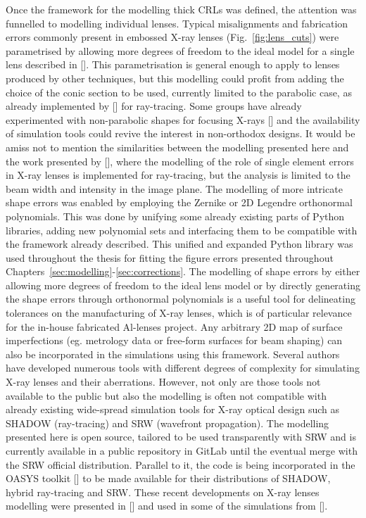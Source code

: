 \begin{refsection}
Once the framework for the modelling thick CRLs was defined, the attention was funnelled to modelling individual lenses. Typical misalignments and fabrication errors commonly present in embossed X-ray lenses (Fig.~\ref{fig:lens_cuts}) were parametrised by allowing more degrees of freedom to the ideal model for a single lens described in [\cite{Baltser2011}]. This parametrisation is general enough to apply to lenses produced by other techniques, but this modelling could profit from adding the choice of the conic section to be used, currently limited to the parabolic case, as already implemented by [\cite{SanchezdelRio2012,Andrejczuk2010}] for ray-tracing. Some groups have already experimented with non-parabolic shapes for focusing X-rays [\cite{Alianelli2007,Evans-Lutterodt2003, Alianelli2015, Sutter2017}] and the availability of simulation tools could revive the interest in non-orthodox designs. It would be amiss not to mention the similarities between the modelling presented here and the work presented by [\cite{Andrejczuk2010}], where the modelling of the role of single element errors in X-ray lenses is implemented for ray-tracing, but the analysis is limited to the beam width and intensity in the image plane. The modelling of more intricate shape errors was enabled by employing the Zernike or 2D Legendre orthonormal polynomials. This was done by unifying some already existing parts of Python libraries, adding new polynomial sets and interfacing them to be compatible with the framework already described. This unified and expanded Python library was used throughout the thesis for fitting the figure errors presented throughout Chapters~\ref{sec:modelling}-\ref{sec:corrections}. The modelling of shape errors by either allowing more degrees of freedom to the ideal lens model or by directly generating the shape errors through orthonormal polynomials is a useful tool for delineating tolerances on the manufacturing of X-ray lenses, which is of particular relevance for the in-house fabricated Al-lenses project. Any arbitrary 2D map of surface imperfections (eg. metrology data or free-form surfaces for beam shaping) can also be incorporated in the simulations using this framework. Several authors have developed numerous tools with different degrees of complexity for simulating X-ray lenses and their aberrations. However, not only are those tools not available to the public but also the modelling is often not compatible with already existing wide-spread simulation tools for X-ray optical design such as SHADOW (ray-tracing) and SRW (wavefront propagation). The modelling presented here is open source, tailored to be used transparently with SRW and is currently available in a public repository in GitLab until the eventual merge with the SRW official distribution. Parallel to it, the code is being incorporated in the OASYS toolkit [\cite{Rebuffi2017}] to be made available for their distributions of SHADOW, hybrid ray-tracing and SRW. These recent developments on X-ray lenses modelling were presented in [\cite{Celestre2020b}] and used in some of the simulations from [\cite{Chubar2020}].


\end{refsection}
